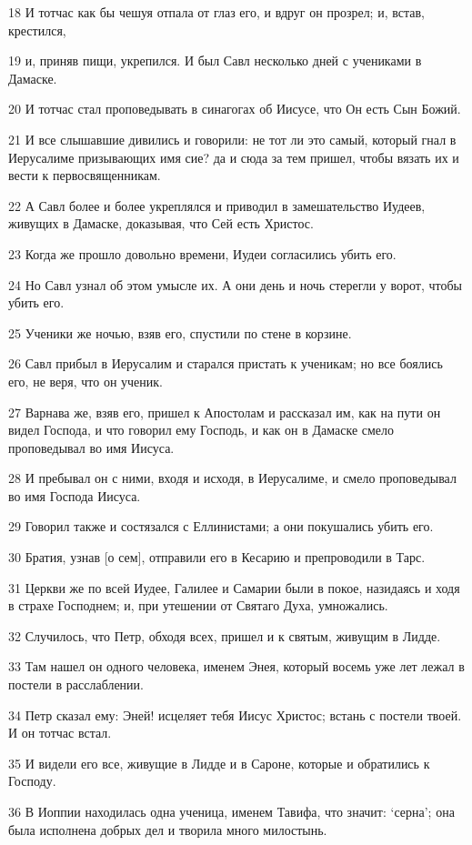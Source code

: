 \par 18 И тотчас как бы чешуя отпала от глаз его, и вдруг он прозрел; и, встав, крестился,
\par 19 и, приняв пищи, укрепился. И был Савл несколько дней с учениками в Дамаске.
\par 20 И тотчас стал проповедывать в синагогах об Иисусе, что Он есть Сын Божий.
\par 21 И все слышавшие дивились и говорили: не тот ли это самый, который гнал в Иерусалиме призывающих имя сие? да и сюда за тем пришел, чтобы вязать их и вести к первосвященникам.
\par 22 А Савл более и более укреплялся и приводил в замешательство Иудеев, живущих в Дамаске, доказывая, что Сей есть Христос.
\par 23 Когда же прошло довольно времени, Иудеи согласились убить его.
\par 24 Но Савл узнал об этом умысле их. А они день и ночь стерегли у ворот, чтобы убить его.
\par 25 Ученики же ночью, взяв его, спустили по стене в корзине.
\par 26 Савл прибыл в Иерусалим и старался пристать к ученикам; но все боялись его, не веря, что он ученик.
\par 27 Варнава же, взяв его, пришел к Апостолам и рассказал им, как на пути он видел Господа, и что говорил ему Господь, и как он в Дамаске смело проповедывал во имя Иисуса.
\par 28 И пребывал он с ними, входя и исходя, в Иерусалиме, и смело проповедывал во имя Господа Иисуса.
\par 29 Говорил также и состязался с Еллинистами; а они покушались убить его.
\par 30 Братия, узнав [о сем], отправили его в Кесарию и препроводили в Тарс.
\par 31 Церкви же по всей Иудее, Галилее и Самарии были в покое, назидаясь и ходя в страхе Господнем; и, при утешении от Святаго Духа, умножались.
\par 32 Случилось, что Петр, обходя всех, пришел и к святым, живущим в Лидде.
\par 33 Там нашел он одного человека, именем Энея, который восемь уже лет лежал в постели в расслаблении.
\par 34 Петр сказал ему: Эней! исцеляет тебя Иисус Христос; встань с постели твоей. И он тотчас встал.
\par 35 И видели его все, живущие в Лидде и в Сароне, которые и обратились к Господу.
\par 36 В Иоппии находилась одна ученица, именем Тавифа, что значит: `серна'; она была исполнена добрых дел и творила много милостынь.
